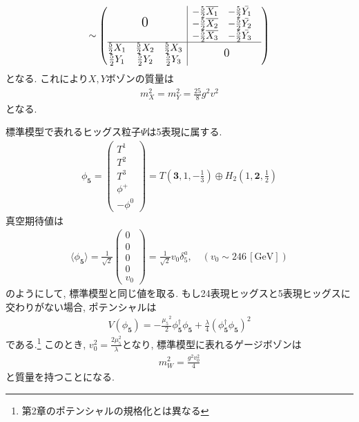 \begin{align}
  [V_\mu, \Sigma] \sim \left(\begin{array}{@{}c|c@{}}
      {\Large{\mbox{$0$}}} &
      \begin{matrix}
        -\frac{5}{2}\overline{X_1} & -\frac{5}{2}\bar{Y_1} &   \\
        -\frac{5}{2}\overline{X_2} & -\frac{5}{2}\bar{Y_2} &   \\
        -\frac{5}{2}\overline{X_3} & -\frac{5}{2}\bar{Y_3} &   \\
      \end{matrix} \\
      \hline
      \begin{matrix}
        \frac{5}{2}X_1 & \frac{5}{2}X_2 & \frac{5}{2}X_3 \\
        \frac{5}{2}Y_1 & \frac{5}{2}Y_2 & \frac{5}{2}Y_3 \\
      \end{matrix} & {\large{\mbox{$0$}}}
  \end{array}\right)
\end{align}  
となる.
これにより$X, Y$ボゾンの質量は
\begin{align}
  m_X^2 = m_Y^2 = \frac{25}{8}g^2v^2
\end{align}
となる.

標準模型で表れるヒッグス粒子$\Psi$は5表現に属する.
\begin{align}
  \phi_{\bm{5}} = \left(
  \begin{array}{c}
      T^1 \\
      T^2 \\
      T^3 \\
      \phi^+ \\
      -\phi^0
  \end{array}\right) = T\left(\bm{3}, 1,-\frac{1}{3}\right)\oplus H_2\left(1,\bm{2},\frac{1}{2}\right)\label{Higgs_5}
\end{align}
真空期待値は
\begin{align}
  \langle\phi_{\bm{5}}\rangle = \frac{1}{\sqrt{2}}\left(
  \begin{array}{c}
      0 \\
      0 \\
      0 \\
      0 \\
      v_0
  \end{array}\right) = \frac{1}{\sqrt{2}}v_0\delta_5^a,\quad(v_0\sim 246\,[\mathrm{GeV}]) \label{Higgs_VEV_5}
\end{align}
のようにして, 標準模型と同じ値を取る.
もし24表現ヒッグスと5表現ヒッグスに交わりがない場合, ポテンシャルは
\begin{align}
  V(\phi_{\bm{5}}) = -\frac{{\mu_5}^2}{2}\phi_{\bm{5}}^\dagger \phi_{\bm{5}} + \frac{\lambda}{4}(\phi_{\bm{5}}^\dagger \phi_{\bm{5}})^2
\end{align}
である.\footnote{第2章のポテンシャルの規格化とは異なる}
このとき, $v_0^2 =\frac{2\mu_5^2}{\lambda}$となり, 標準模型に表れるゲージボゾンは
\begin{align}
  m_W^2 = \frac{g^2 v_0^2}{4}
\end{align}
と質量を持つことになる.
